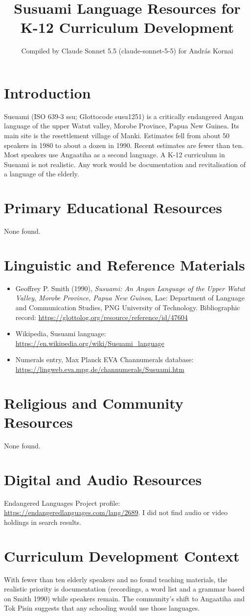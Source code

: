 \documentclass[12pt]{article}
\title{Susuami Language Resources for K-12 Curriculum Development}
\author{Compiled by Claude Sonnet 5.5 (claude-sonnet-5-5) for Andr\'as Kornai}
\date{}
\begin{document}
\maketitle

\section{Introduction}
Susuami (ISO 639-3 ssu; Glottocode susu1251) is a critically endangered Angan language of the upper Watut valley, Morobe Province, Papua New Guinea. Its main site is the resettlement village of Manki. Estimates fell from about 50 speakers in 1980 to about a dozen in 1990. Recent estimates are fewer than ten. Most speakers use Angaatiha as a second language. A K-12 curriculum in Susuami is not realistic. Any work would be documentation and revitalisation of a language of the elderly.

\section{Primary Educational Resources}
None found.

\section{Linguistic and Reference Materials}
\begin{itemize}
\item Geoffrey P. Smith (1990), \emph{Susuami: An Angan Language of the Upper Watut Valley, Morobe Province, Papua New Guinea}, Lae: Department of Language and Communication Studies, PNG University of Technology. Bibliographic record: \url{https://glottolog.org/resource/reference/id/47604}
\item Wikipedia, Susuami language: \url{https://en.wikipedia.org/wiki/Susuami_language}
\item Numerals entry, Max Planck EVA Channumerals database: \url{https://lingweb.eva.mpg.de/channumerals/Susuami.htm}
\end{itemize}

\section{Religious and Community Resources}
None found.

\section{Digital and Audio Resources}
Endangered Languages Project profile: \url{https://endangeredlanguages.com/lang/2689}. I did not find audio or video holdings in search results.

\section{Curriculum Development Context}
With fewer than ten elderly speakers and no found teaching materials, the realistic priority is documentation (recordings, a word list and a grammar based on Smith 1990) while speakers remain. The community's shift to Angaatiha and Tok Pisin suggests that any schooling would use those languages.
\end{document}
